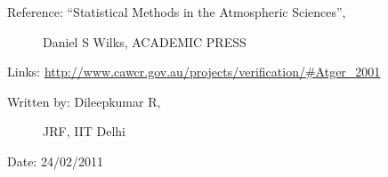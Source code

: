 \documentclass[letterpaper,10pt,english]{sphinxmanual}
\begin{document}
\begin{fulllineitems}
\begin{description}
\item[{Reference: ``Statistical Methods in the Atmospheric Sciences'',}] \leavevmode
Daniel S Wilks, ACADEMIC PRESS

\end{description}

Links: \href{http://www.cawcr.gov.au/projects/verification/\#Atger\_2001}{http://www.cawcr.gov.au/projects/verification/\#Atger\_2001}
\begin{description}
\item[{Written by: Dileepkumar R,}] \leavevmode
JRF, IIT Delhi

\end{description}

Date: 24/02/2011

\end{fulllineitems}

\end{document}

